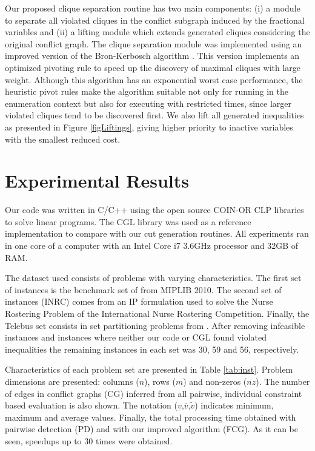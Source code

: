 \documentclass{endm}
\begin{document}
Our proposed clique separation routine has two main components: (i) a module to separate all violated cliques in the conflict subgraph induced by the fractional variables and (ii) a lifting module which extends generated cliques considering the original conflict graph. The clique separation module was implemented using an improved version of the Bron-Kerbosch algorithm \cite{Bron1973}. This version implements an optimized pivoting rule \cite{Brito2011} to speed up the discovery of maximal cliques with large weight.  Although this algorithm has an exponential worst case performance, the heuristic pivot rules  make the algorithm suitable not only for running in the enumeration context but also for executing with restricted times, since larger violated cliques tend to be discovered first. We also lift all generated inequalities as presented in Figure \ref{figLiftings}, giving higher priority to inactive variables with the smallest reduced cost.  

\begin{figure}
\begin{center}
\label{figOH}
\end{center}
\end{figure}


\section{Experimental Results}\label{experiments}

Our code was written in C/C++ using the open source COIN-OR CLP libraries to solve linear programs. The CGL library was used as a reference implementation to compare with our cut generation routines. All experiments ran in one core of a computer with an Intel Core i7 3.6GHz processor and 32GB of RAM.

The dataset used consists of problems with varying characteristics. The first set of instances is the benchmark set of from MIPLIB 2010\cite{miplib}. The second set of instances (INRC) comes from an IP formulation  used to solve the Nurse Rostering Problem  \cite{Santos2014} of the International Nurse Rostering Competition. Finally, the Telebus set consists in set partitioning problems from \cite{Borndorfer1998}. After removing infeasible instances and instances where neither our code or CGL found violated inequalities the remaining instances in each set was 30, 59 and 56, respectively.

Characteristics of each problem set are presented in Table \ref{tab:inst}. Problem dimensions are presented: columns ($n$), rows ($m$) and non-zeros ($nz$). The number of edges in conflict graphs (CG) inferred from all pairwise, individual constraint based evaluation is also shown. The notation ($\underline{v}$,$\overline{v}$,$\tilde{v}$) indicates minimum, maximum and average values. Finally, the total processing time obtained with pairwise detection (PD) and with our improved algorithm (FCG). As it can be seen, speedups up to 30 times were obtained.
\end{document}
